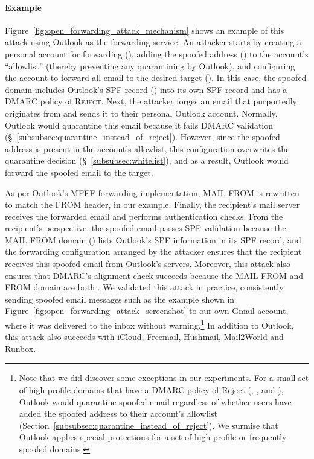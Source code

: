 \paragraph{Example}
Figure~\ref{fig:open_forwarding_attack_mechanism} shows an example of
this attack using Outlook as the forwarding service.
An attacker starts by creating a personal account for
forwarding (), adding the spoofed address
() to the account's ``allowlist'' (thereby
preventing any quarantining by Outlook), and configuring the account to
forward all email to the desired target (). In this case, the spoofed domain  includes
Outlook's SPF record () into its own SPF record and has a DMARC policy of \textsc{Reject}. Next, the attacker forges an email that purportedly originates from  and sends it to their personal Outlook account. Normally, Outlook would quarantine this email because it fails DMARC validation (\S~\ref{subsubsec:quarantine_instead_of_reject}). However, since the spoofed address is present in the account's allowlist, this configuration overwrites the quarantine decision (\S~\ref{subsubsec:whitelist}), and as a result, Outlook would forward the spoofed email to the target.


As per Outlook's MFEF forwarding implementation,
\textsc{MAIL FROM}
is rewritten to match the
\textsc{FROM} header,  in our example. Finally, the recipient's mail server receives the forwarded email
and performs authentication checks.
From the recipient's perspective,
the spoofed email passes SPF validation because the
\textsc{MAIL FROM} domain () lists Outlook's SPF
information in its SPF record, and the forwarding configuration
arranged by the attacker ensures that the recipient receives this
spoofed email from Outlook's servers.
Moreover, this attack also
ensures that DMARC's alignment check succeeds because the
\textsc{MAIL FROM} and \textsc{FROM} domain are both .
We validated this attack in practice, consistently sending
spoofed email messages such as the example
shown in Figure~\ref{fig:open_forwarding_attack_screenshot}
to our own Gmail account, where it was delivered to the inbox without warning.\footnote{
Note that we did discover some exceptions in our experiments.
For a small set of high-profile domains that have a DMARC policy of Reject
(\eg, ,  and ), Outlook would
quarantine spoofed email regardless of whether users have added the
spoofed address to their account's allowlist (Section~\ref{subsubsec:quarantine_instead_of_reject}).
We surmise that Outlook applies special protections for a set of high-profile or frequently spoofed domains.
} 
In addition to Outlook, this attack also succeeds with
iCloud, Freemail, Hushmail, Mail2World and Runbox.


